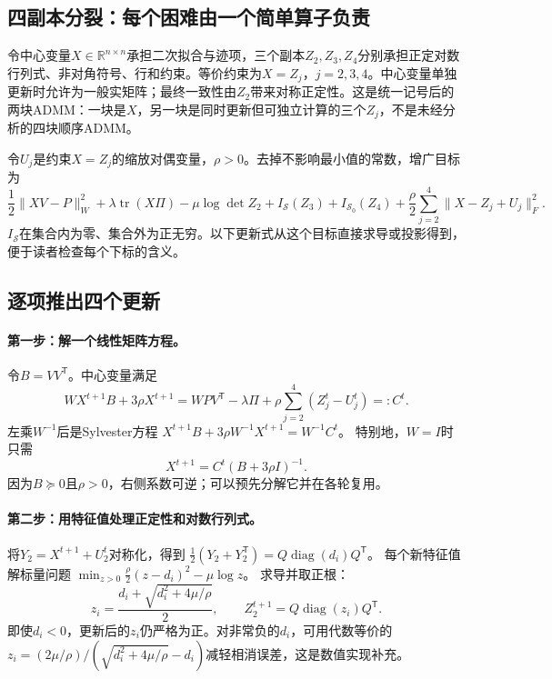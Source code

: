 \subsection{四副本分裂：每个困难由一个简单算子负责}

令中心变量$X\in\mathbb R^{n\times n}$承担二次拟合与迹项，三个副本$Z_2,Z_3,Z_4$分别承担正定对数行列式、非对角符号、行和约束。等价约束为$X=Z_j$，$j=2,3,4$。中心变量单独更新时允许为一般实矩阵；最终一致性由$Z_2$带来对称正定性。这是统一记号后的两块ADMM：一块是$X$，另一块是同时更新但可独立计算的三个$Z_j$，不是未经分析的四块顺序ADMM。

令$U_j$是约束$X=Z_j$的缩放对偶变量，$\rho>0$。去掉不影响最小值的常数，增广目标为
\[
 \frac12\|XV-P\|_W^2+\lambda\operatorname{tr}(X\Pi)
 -\mu\log\det Z_2+I_{\mathcal S}(Z_3)+I_{\mathcal S_0}(Z_4)
 +\frac\rho2\sum_{j=2}^4\|X-Z_j+U_j\|_F^2.
\]
$I_{\mathcal S}$在集合内为零、集合外为正无穷。以下更新式从这个目标直接求导或投影得到，便于读者检查每个下标的含义。

\subsection{逐项推出四个更新}

\paragraph{第一步：解一个线性矩阵方程。}
令$B=VV^{\mathsf T}$。中心变量满足
\begin{equation}
 WX^{t+1}B+3\rho X^{t+1}
 =WPV^{\mathsf T}-\lambda\Pi+
   \rho\sum_{j=2}^4(Z_j^t-U_j^t)=:C^t.
 \label{eq:tb-P1-X}
\end{equation}
左乘$W^{-1}$后是Sylvester方程
$X^{t+1}B+3\rho W^{-1}X^{t+1}=W^{-1}C^t$。
特别地，$W=I$时只需
\[
 X^{t+1}=C^t(B+3\rho I)^{-1}.
\]
因为$B\succeq0$且$\rho>0$，右侧系数可逆；可以预先分解它并在各轮复用。

\paragraph{第二步：用特征值处理正定性和对数行列式。}
将$Y_2=X^{t+1}+U_2^t$对称化，得到
$\tfrac12(Y_2+Y_2^{\mathsf T})=Q\operatorname{diag}(d_i)Q^{\mathsf T}$。
每个新特征值解标量问题
$\min_{z>0}\frac\rho2(z-d_i)^2-\mu\log z$。
求导并取正根：
\begin{equation}
 z_i=\frac{d_i+\sqrt{d_i^2+4\mu/\rho}}2,\qquad
 Z_2^{t+1}=Q\operatorname{diag}(z_i)Q^{\mathsf T}.
 \label{eq:tb-P1-Z2}
\end{equation}
即使$d_i<0$，更新后的$z_i$仍严格为正。对非常负的$d_i$，可用代数等价的
$z_i=(2\mu/\rho)/(\sqrt{d_i^2+4\mu/\rho}-d_i)$减轻相消误差，这是数值实现补充。

